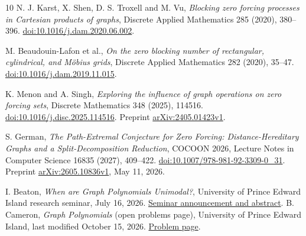 \documentclass[11pt]{article}
\begin{document}
\begin{thebibliography}{10}
 N. J. Karst, X. Shen, D. S. Troxell and M. Vu,
\emph{Blocking zero forcing processes in Cartesian products of graphs},
Discrete Applied Mathematics 285 (2020), 380--396.
\href{https://doi.org/10.1016/j.dam.2020.06.002}{doi:10.1016/j.dam.2020.06.002}.

 M. Beaudouin-Lafon et al.,
\emph{On the zero blocking number of rectangular, cylindrical, and M\"obius grids},
Discrete Applied Mathematics 282 (2020), 35--47.
\href{https://doi.org/10.1016/j.dam.2019.11.015}{doi:10.1016/j.dam.2019.11.015}.

 K. Menon and A. Singh,
\emph{Exploring the influence of graph operations on zero forcing sets},
Discrete Mathematics 348 (2025), 114516.
\href{https://doi.org/10.1016/j.disc.2025.114516}{doi:10.1016/j.disc.2025.114516}.
Preprint \href{https://arxiv.org/abs/2405.01423v1}{arXiv:2405.01423v1}.

 S. German,
\emph{The Path-Extremal Conjecture for Zero Forcing: Distance-Hereditary
Graphs and a Split-Decomposition Reduction}, COCOON 2026,
Lecture Notes in Computer Science 16835 (2027), 409--422.
\href{https://doi.org/10.1007/978-981-92-3309-0_31}{doi:10.1007/978-981-92-3309-0\_31}.
Preprint \href{https://arxiv.org/abs/2605.10836v1}{arXiv:2605.10836v1}, May 11, 2026.

 I. Beaton, \emph{When are Graph Polynomials Unimodal?},
University of Prince Edward Island research seminar, July 16, 2026.
\href{https://www.upei.ca/notice/2026/07/smcs-research-seminar-when-are-graph-polynomials-unimodal}{Seminar announcement and abstract}.
 B. Cameron, \emph{Graph Polynomials} (open problems page),
University of Prince Edward Island, last modified October 15, 2026.
\href{https://www.smcs.upei.ca/~brcameron/graphpolys.html}{Problem page}.
\end{thebibliography}
\end{document}
